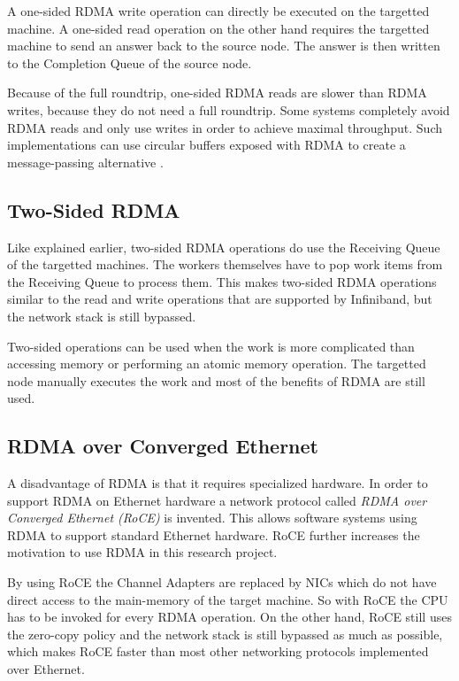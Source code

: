 A one-sided RDMA write operation can directly be executed on the targetted machine. A one-sided read operation on the other hand requires the targetted machine to send an answer back to the source node. The answer is then written to the Completion Queue of the source node. 

Because of the full roundtrip, one-sided RDMA reads are slower than RDMA writes, because they do not need a full roundtrip. Some systems completely avoid RDMA reads and only use writes in order to achieve maximal throughput. Such implementations can use circular buffers exposed with RDMA to create a message-passing alternative \cite{farm}.

\subsection{Two-Sided RDMA}
Like explained earlier, two-sided RDMA operations do use the Receiving Queue of the targetted machines. The workers themselves have to pop work items from the Receiving Queue to process them. This makes two-sided RDMA operations similar to the read and write operations that are supported by Infiniband, but the network stack is still bypassed.

Two-sided operations can be used when the work is more complicated than accessing memory or performing an atomic memory operation. The targetted node manually executes the work and most of the benefits of RDMA are still used.

\subsection{RDMA over Converged Ethernet}
A disadvantage of RDMA is that it requires specialized hardware. In order to support RDMA on Ethernet hardware a network protocol called \emph{RDMA over Converged Ethernet (RoCE)} is invented. This allows software systems using RDMA to support standard Ethernet hardware. RoCE further increases the motivation to use RDMA in this research project.

By using RoCE the Channel Adapters are replaced by NICs which do not have direct access to the main-memory of the target machine. So with RoCE the CPU has to be invoked for every RDMA operation. On the other hand, RoCE still uses the zero-copy policy and the network stack is still bypassed as much as possible, which makes RoCE faster than most other networking protocols implemented over Ethernet.

